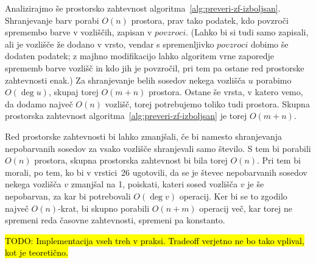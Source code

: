 \documentclass[12pt,a4paper,twoside]{article}
\theoremstyle{definition} %
\theoremstyle{plain} %
\numberwithin{equation}{section}  %
\begin{document}
Analizirajmo še prostorsko zahtevnost algoritma~\ref{alg:preveri-zf-izboljsan}. Shranjevanje barv porabi $O(n)$ prostora, prav tako podatek, kdo povzroči spremembo barve v vozliščih, zapisan v $povzroci$. (Lahko bi si tudi samo zapisali, ali je vozlišče že dodano v vrsto, vendar s spremenljivko $povzroci$ dobimo še dodaten podatek; z majhno modifikacijo lahko algoritem vrne zaporedje sprememb barve vozlišč in kdo jih je povzročil, pri tem pa ostane red prostorske zahtevnosti enak.) Za shranjevanje belih sosedov nekega vozlišča $u$ porabimo $O(\deg u)$, skupaj torej $O(m+n)$ prostora. Ostane še vrsta, v katero vemo, da dodamo največ $O(n)$ vozlišč, torej potrebujemo toliko tudi prostora. Skupna prostorska zahtevnost algoritma~\ref{alg:preveri-zf-izboljsan} je torej $O(m+n)$.

Red prostorske zahtevnosti bi lahko zmanjšali, če bi namesto shranjevanja nepobarvanih sosedov za vsako vozlišče shranjevali samo število. S tem bi porabili $O(n)$ prostora, skupna prostorska zahtevnost bi bila torej $O(n)$. Pri tem bi morali, po tem, ko bi v vrstici~26 ugotovili, da se je števec nepobarvanih sosedov nekega vozlišča $v$ zmanjšal na 1, poiskati, kateri sosed vozlišča $v$ je še nepobarvan, za kar bi potrebovali $O(\deg v)$ operacij. Ker bi se to zgodilo največ $O(n)$-krat, bi skupno porabili $O(n+m)$ operacij več, kar torej ne spremeni reda časovne zahtevnosti, spremeni pa konstanto.

\hl{TODO: Implementacija vseh treh v praksi. Tradeoff verjetno ne bo tako vplival, kot je teoretično.}

\end{document}
